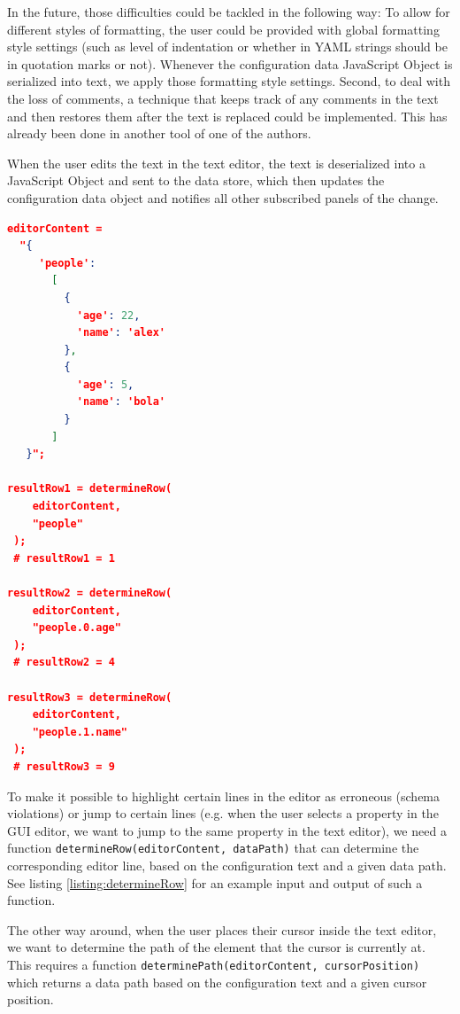 In the future, those difficulties could be tackled in the following way: To allow for different styles of formatting, the user could be provided with global formatting style settings (such as level of indentation or whether in YAML strings should be in quotation marks or not). 
Whenever the configuration data JavaScript Object is serialized into text, we apply those formatting style settings.
Second, to deal with the loss of comments, a technique that keeps track of any comments in the text and then restores them after the text is replaced could be implemented. This has already been done in another tool of one of the authors\cite{githubBspEditor}.

When the user edits the text in the text editor, the text is deserialized into a JavaScript Object and sent to the data store, which then updates the configuration data object and notifies all other subscribed panels of the change.

\begin{lstlisting}[language=json,firstnumber=1,caption=
    {Example input and output for
\textit{determineRow(editorContent, dataPath)}},captionpos=b]
editorContent =
  "{
     'people':
       [
         {
           'age': 22,
           'name': 'alex'
         },
         {
           'age': 5,
           'name': 'bola'
         }
       ]
   }";

resultRow1 = determineRow(
	editorContent,
	"people"
 );
 # resultRow1 = 1

resultRow2 = determineRow(
	editorContent,
	"people.0.age"
 );
 # resultRow2 = 4

resultRow3 = determineRow(
	editorContent,
	"people.1.name"
 );
 # resultRow3 = 9
\end{lstlisting}\label{listing:determineRow}

To make it possible to highlight certain lines in the editor as erroneous (schema violations) or jump to certain lines (e.g. when the user selects a property in the GUI editor, we want to jump to the same property in the text editor), we need a function \texttt{determineRow(editorContent, dataPath)} that can determine the corresponding editor line, based on the configuration text and a given data path. See listing \ref{listing:determineRow} for an example input and output of such a function.

The other way around, when the user places their cursor inside the text editor, we want to determine the path of the element that the cursor is currently at. This requires a function \texttt{determinePath(editorContent, cursorPosition)} which returns a data path based on the configuration text and a given cursor position.

